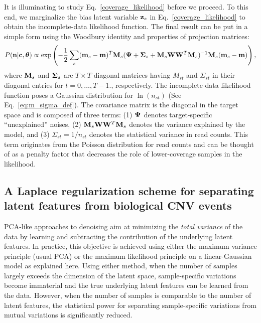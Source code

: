 \documentclass[nofootinbib,amssymb,amsmath]{revtex4}
\newcommand{\vc}{{\bf c}}
\newcommand{\vz}{{\bf z}}
\newcommand{\vn}{{\bf n}}
\newcommand{\vm}{{\bf m}}
\newcommand{\vM}{{\bf M}}
\newcommand{\vW}{{\bf W}}
\newcommand{\vPsi}{{\bf \Psi}}
\newcommand{\vSigma}{{\bf \Sigma}}
\newcommand{\vtheta}{{\boldsymbol \theta}}
\begin{document}
It is illuminating to study Eq.~\eqref{coverage_likelihood} before we proceed. To this end, we marginalize the bias latent variable $\vz_s$ in Eq.~\eqref{coverage_likelihood} to obtain the incomplete-data likelihood function. The final result can be put in a simple form using the Woodbury identity and properties of projection matrices:
%
\begin{equation}
P(\vn | \vc, \vtheta) \propto \exp \left( -\frac{1}{2} \sum_s (\vm_s - \vm)^T \vM_s (\vPsi + \vSigma_s + \vM_s \vW \vW^T \vM_s)^{-1} \vM_s (\vm_s - \vm) \right),
\label{marginalized coverage_likelihood}
\end{equation}
%
where $\vM_s$ and $\vSigma_{s}$ are $T \times T$ diagonal matrices having $M_{st}$ and $\Sigma_{st}$ in their diagonal entries for $t=0, \ldots, T-1$., respectively. The incomplete-data likelihood function poses a Gaussian distribution for $\ln(n_{st})$ (See Eq.~\ref{eq:m_sigma_def}). The covariance matrix is the diagonal in the target space and is composed of three terms: (1) $\vPsi$ denotes target-specific ``unexplained'' noises, (2) $\vM_s \vW \vW^T \vM_s$ denotes the variance explained by the model, and (3) $\Sigma_{st} = 1/n_{st}$ denotes the statistical variance in read counts. This term originates from the Poisson distribution for read counts and can be thought of as a penalty factor that decreases the role of lower-coverage samples in the likelihood.

\subsection{A Laplace regularization scheme for separating latent features from biological CNV events}
PCA-like approaches to denoising aim at minimizing the {\em total variance} of the data by learning and subtracting the contribution of the underlying latent features. In practice, this objective is achieved using either the maximum variance principle (usual PCA) or the maximum likelihood principle on a linear-Gaussian model as explained here. Using either method, when the number of samples largely exceeds the dimension of the latent space, sample-specific variations become immaterial and the true underlying latent features can be learned from the data. However, when the number of samples is comparable to the number of latent features, the statistical power for separating sample-specific variations from mutual variations is significantly reduced.
\end{document}

